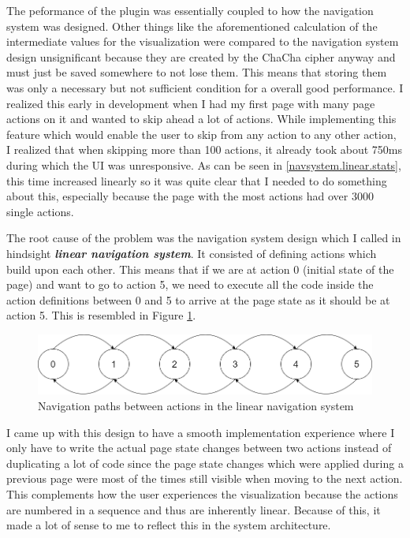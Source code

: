 The peformance of the plugin was essentially coupled to how the navigation system was designed. Other things like the aforementioned calculation of the intermediate values for the visualization were compared to the navigation system design unsignificant because they are created by the ChaCha cipher anyway and must just be saved somewhere to not lose them. This means that storing them was only a necessary but not sufficient condition for a overall good performance. I realized this early in development when I had my first page with many page actions on it and wanted to skip ahead a lot of actions. While implementing this feature which would enable the user to skip from any action to any other action, I realized that when skipping more than 100 actions, it already took about 750ms during which the UI was unresponsive. As can be seen in \ref{navsystem.linear.stats}, this time increased linearly so it was quite clear that I needed to do something about this, especially because the page with the most actions had over 3000 single actions.

\par

The root cause of the problem was the navigation system design which I called in hindsight \textbf{\textit{linear navigation system}}. It consisted of defining actions which build upon each other. This means that if we are at action 0 (initial state of the page) and want to go to action 5, we need to execute all the code inside the action definitions between 0 and 5 to arrive at the page state as it should be at action 5. This is resembled in Figure \ref{navsystem.linear.overview}.

\begin{figure}
\caption{Navigation paths between actions in the linear navigation system}
\label{navsystem.linear.overview}
\includegraphics[width=\textwidth]{figures/navigationsystem-linear-overview.png}
\end{figure}

I came up with this design to have a smooth implementation experience where I only have to write the actual page state changes between two actions instead of duplicating a lot of code since the page state changes which were applied during a previous page were most of the times still visible when moving to the next action. This complements how the user experiences the visualization because the actions are numbered in a sequence and thus are inherently linear. Because of this, it made a lot of sense to me to reflect this in the system architecture.

